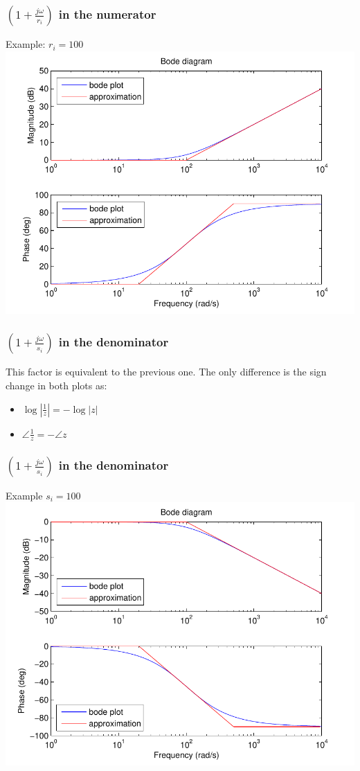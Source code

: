 \begin{frame}
\frametitle{$(1+\frac{j\omega}{r_i})$ in the numerator}
Example: $r_i = 100$
\includegraphics[scale=0.5]{BodeNumerator}

\end{frame}



\begin{frame}
\frametitle{$(1+\frac{j\omega}{s_i})$ in the denominator}
This factor is equivalent to the previous one. The only difference is the sign change in both plots as:
\begin{itemize}
\item $\log |\frac{1}{z}| = -\log|z|$
\item $\angle \frac{1}{z} = -\angle z$
\end{itemize}


\end{frame}


\begin{frame}
\frametitle{$(1+\frac{j\omega}{s_i})$ in the denominator}
Example $s_i = 100$
\includegraphics[scale=0.5]{BodeDenominator}


\end{frame}


